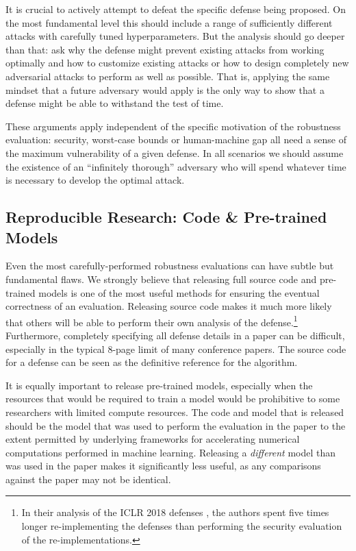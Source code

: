 \documentclass{article} %
\begin{document}
It is crucial to actively attempt to defeat the specific defense being proposed.
%
On the most fundamental level
this should include a range of sufficiently different attacks with carefully tuned
hyperparameters.
%
But the analysis should go deeper than that:
ask why the defense might prevent existing attacks
from working optimally and how to customize existing
attacks or how to design completely new adversarial attacks to
perform as well as possible.
%
That is, applying the same mindset that a
future adversary would apply is the only way to show
that a defense might be able to withstand the test of time.

These arguments apply independent of the specific motivation of
the robustness evaluation: security, worst-case bounds
or human-machine gap all need a sense of the maximum vulnerability
of a given defense.
%
In all scenarios we should assume
the existence of an ``infinitely thorough'' adversary who will spend whatever time is
necessary to develop the optimal attack.


\subsection{Reproducible Research: Code \& Pre-trained Models}
\label{sec:releasecode}

Even the most carefully-performed robustness evaluations can have
subtle but fundamental flaws.
%
We strongly believe that releasing full source code and pre-trained models is one of the most
useful methods for ensuring the eventual correctness of an evaluation.
%
Releasing source code makes it much more likely that others will be able to
perform their own analysis of the defense.\footnote{In their analysis
  of the ICLR 2018 defenses \citep{athalye2018obfuscated}, the
  authors spent five times longer re-implementing the defenses than
  performing the security evaluation of the re-implementations.}
%
Furthermore, completely specifying all defense details in a paper can be
difficult, especially in the typical 8-page limit of many
conference papers.
%
The source code for a defense can be seen as the definitive
reference for the algorithm.

It is equally important to release pre-trained models, especially when
the resources that would be required to train a model would be prohibitive
to some researchers with limited compute resources.
%
The code and model that is released should be the model that was used
to perform the evaluation in the paper to the extent permitted by
underlying frameworks for accelerating numerical computations
performed in machine learning.
%
Releasing a \emph{different}
model than was used in the paper makes it significantly less useful,
as any comparisons against the paper may not be identical.
\end{document}
